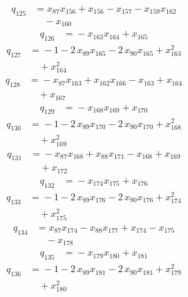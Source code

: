 \documentclass[11pt]{article}
\theoremstyle{remark}\newtheorem{remark}[theorem]{Remark}
\begin{document}
\begin{align*}
q_{125} &={}x_{87}x_{156} +x_{156} -x_{157} -x_{159}x_{162}\\
&\quad -x_{160}
\end{align*}
\begin{align*}
q_{126} &={}-x_{163}x_{164} +x_{165}
\end{align*}
\begin{align*}
q_{127} &={}-1 -2\,x_{89}x_{165} -2\,x_{90}x_{165} +x_{163}^{2}\\
&\quad +x_{164}^{2}
\end{align*}
\begin{align*}
q_{128} &={}-x_{87}x_{163} +x_{162}x_{166} -x_{163} +x_{164}\\
&\quad +x_{167}
\end{align*}
\begin{align*}
q_{129} &={}-x_{168}x_{169} +x_{170}
\end{align*}
\begin{align*}
q_{130} &={}-1 -2\,x_{89}x_{170} -2\,x_{90}x_{170} +x_{168}^{2}\\
&\quad +x_{169}^{2}
\end{align*}
\begin{align*}
q_{131} &={}-x_{87}x_{168} +x_{88}x_{171} -x_{168} +x_{169}\\
&\quad +x_{172}
\end{align*}
\begin{align*}
q_{132} &={}-x_{174}x_{175} +x_{176}
\end{align*}
\begin{align*}
q_{133} &={}-1 -2\,x_{89}x_{176} -2\,x_{90}x_{176} +x_{174}^{2}\\
&\quad +x_{175}^{2}
\end{align*}
\begin{align*}
q_{134} &={}x_{87}x_{174} -x_{88}x_{177} +x_{174} -x_{175}\\
&\quad -x_{178}
\end{align*}
\begin{align*}
q_{135} &={}-x_{179}x_{180} +x_{181}
\end{align*}
\begin{align*}
q_{136} &={}-1 -2\,x_{89}x_{181} -2\,x_{90}x_{181} +x_{179}^{2}\\
&\quad +x_{180}^{2}
\end{align*}
\end{document}

